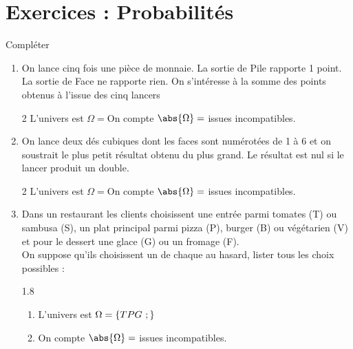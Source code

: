\documentclass[main.tex]{subfiles}
\begin{document}
\newpage 
{}  
\pagestyle{scrheadings} %
\onehalfspacing
\section{Exercices : Probabilités} 
 
\begin{exercise} Compléter \hfill 
\begin{enumerate}[label=\arabic*),leftmargin=*]
\item On lance cinq fois une pièce de monnaie. La sortie de Pile rapporte 1 point. La sortie de Face ne rapporte rien. On s'intéresse à la somme des points obtenus à l'issue des cinq lancers
\vspace{-0.25em} 
\begin{spacing}{2}
	L'univers est $\Omega=$\dotfill   On compte $\abs{\Omega}=$ \dotfill issues incompatibles. 
\end{spacing}	
\vspace{-0.25em}
\item On lance deux dés cubiques dont les faces sont numérotées de 1 à 6 et on soustrait le plus petit résultat obtenu du plus grand. Le résultat est nul si le lancer produit un double. 
\vspace{-0.25em}
\begin{spacing}{2}
 L'univers est $\Omega=$\dotfill   On compte $\abs{\Omega}=$ \dotfill issues incompatibles. 
\end{spacing} 	
\vspace{-0.25em}
\item Dans un restaurant les clients choisissent une entrée parmi tomates (T) ou sambusa (S), un plat principal parmi pizza (P), burger (B) ou végétarien (V) et pour le dessert     une glace (G) ou un fromage (F).\\
On suppose qu'ils choisissent un de chaque au hasard, lister tous les choix possibles :
\vspace{-0.5em}
\begin{spacing}{1.8}
\begin{enumerate}[label={},leftmargin=*]
	\item L'univers est $\Omega=\{ TPG~; \dotfill\}$ 	
	\item On compte $\abs{\Omega}=$ \dotfill issues incompatibles.
\end{enumerate}  

\end{spacing}
\end{enumerate}
\end{exercise}
\end{document}
